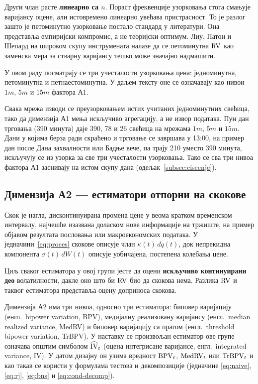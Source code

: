 Други члан расте \textbf{линеарно са $n$}. Пораст фреквенције узорковања стога
смањује варијансу оцене, али истовремено линеарно увећава пристрасност. То је разлог
зашто је петоминутно узорковање постало стандард у литератури. Она представља емпиријски
компромис, а не теоријски оптимум. Лиу, Патон и Шепард \parencite{lps2015} на
широком скупу инструмената налазе да се петоминутна $\mathrm{RV}$ као заменска мера за стварну
варијансу тешко може значајно надмашити.

У овом раду посматрају се три учесталости узорковања цена: једноминутна, петоминутна и
петнаестоминутна. У даљем тексту оне се означавају као нивои $1m$, $5m$ и $15m$ фактора
А1.

Свака мрежа изводи се преузорковањем истих учитаних једноминутних свећица, тако да
димензија А1 мења искључиво агрегацију, а не извор података. Пун дан трговања (390
минута) даје 390, 78 и 26 свећица на мрежама $1m$, $5m$ и $15m$. Дани у којима берза ради
скраћено и трговање се завршава у 13:00, на пример дан после Дана захвалности или
Бадње вече, па трају 210 уместо 390 минута, искључују се из узорка за све три
учесталости узорковања. Тако се сва три нивоа фактора А1 заснивају на истом скупу дана
(одељак~\ref{subsec:ciscenje}).

\subsection{Димензија А2 — естиматори отпорни на скокове}

Скок је нагла, дисконтинуирана промена цене у веома кратком временском интервалу,
најчешће изазвана доласком нове информације на тржиште, на пример објавом резултата
пословања или макроекономских података. У једначини~\eqref{eq:proces} скокове описује
члан $\kappa(t)\,dq(t)$, док непрекидна компонента $\sigma(t)\,dW(t)$ описује
уобичајена, постепена колебања цене.

Циљ сваког естиматора у овој групи јесте да оцени \textbf{искључиво континуирани
део} волатилности, дакле оно што би $\mathrm{RV}$ био да скокова нема. Разлика $\mathrm{RV}$ и
таквог естиматора представља оцену доприноса скокова.

Димензија А2 има три нивоа, односно три естиматора: биповер варијацију (енгл.\ bipower
variation, BPV), медијалну реализовану варијансу (енгл.\ median realized variance,
MedRV) и биповер варијацију са прагом (енгл.\ threshold bipower variation, TrBPV). У
наставку се произвољан естиматор ове групе означава општим симболом $\widehat{\mathrm{IV}}_t$ (оцена
интегрисане варијансе, енгл.\ integrated variance, IV). У датом дизајну он узима вредност $\mathrm{BPV}_t$, $\mathrm{MedRV}_t$ или
$\mathrm{TrBPV}_t$ и као такав се користи у формулама тестова и декомпозиције (једначине
\eqref{eq:naive}, \eqref{eq:rj}, \eqref{eq:bns} и \eqref{eq:cond-decomp}).

